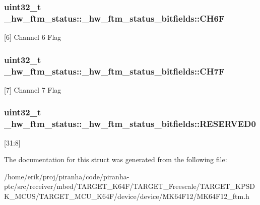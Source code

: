 \subsubsection[{\texorpdfstring{C\+H6F}{CH6F}}]{\setlength{\rightskip}{0pt plus 5cm}uint32\+\_\+t \+\_\+hw\+\_\+ftm\+\_\+status\+::\+\_\+hw\+\_\+ftm\+\_\+status\+\_\+bitfields\+::\+C\+H6F}\hypertarget{struct__hw__ftm__status_1_1__hw__ftm__status__bitfields_a2bafbccce101cd6487e1dc56f6251de8}{}\label{struct__hw__ftm__status_1_1__hw__ftm__status__bitfields_a2bafbccce101cd6487e1dc56f6251de8}
\mbox{[}6\mbox{]} Channel 6 Flag 
\subsubsection[{\texorpdfstring{C\+H7F}{CH7F}}]{\setlength{\rightskip}{0pt plus 5cm}uint32\+\_\+t \+\_\+hw\+\_\+ftm\+\_\+status\+::\+\_\+hw\+\_\+ftm\+\_\+status\+\_\+bitfields\+::\+C\+H7F}\hypertarget{struct__hw__ftm__status_1_1__hw__ftm__status__bitfields_adb2e582e2c73efb6b107cad9334ed604}{}\label{struct__hw__ftm__status_1_1__hw__ftm__status__bitfields_adb2e582e2c73efb6b107cad9334ed604}
\mbox{[}7\mbox{]} Channel 7 Flag 
\subsubsection[{\texorpdfstring{R\+E\+S\+E\+R\+V\+E\+D0}{RESERVED0}}]{\setlength{\rightskip}{0pt plus 5cm}uint32\+\_\+t \+\_\+hw\+\_\+ftm\+\_\+status\+::\+\_\+hw\+\_\+ftm\+\_\+status\+\_\+bitfields\+::\+R\+E\+S\+E\+R\+V\+E\+D0}\hypertarget{struct__hw__ftm__status_1_1__hw__ftm__status__bitfields_a4c6f247d32c52caf34ba2b113a7f42cb}{}\label{struct__hw__ftm__status_1_1__hw__ftm__status__bitfields_a4c6f247d32c52caf34ba2b113a7f42cb}
\mbox{[}31\+:8\mbox{]} 

The documentation for this struct was generated from the following file\+:\begin{DoxyCompactItemize}
\item 
/home/erik/proj/piranha/code/piranha-\/ptc/src/receiver/mbed/\+T\+A\+R\+G\+E\+T\+\_\+\+K64\+F/\+T\+A\+R\+G\+E\+T\+\_\+\+Freescale/\+T\+A\+R\+G\+E\+T\+\_\+\+K\+P\+S\+D\+K\+\_\+\+M\+C\+U\+S/\+T\+A\+R\+G\+E\+T\+\_\+\+M\+C\+U\+\_\+\+K64\+F/device/device/\+M\+K64\+F12/M\+K64\+F12\+\_\+ftm.\+h\end{DoxyCompactItemize}
